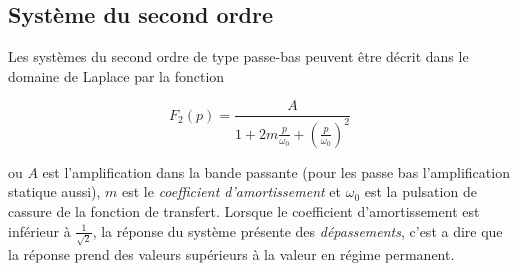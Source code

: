 \documentclass[12pt, a4paper]{report}
\begin{document}
\subsection{Système du second ordre}

Les systèmes du second ordre de type passe-bas peuvent être décrit dans le domaine de Laplace par 
la fonction

\[
  F_{2} (p) =   \frac{A}{1 + 2m \frac{p}{\omega_{0}} + \left( \frac{p}{\omega_{0}} \right)^2}
\]

ou $A$ est l'amplification dans la bande passante (pour les passe bas l'amplification statique aussi), 
$m$ est le \textit{coefficient d'amortissement} et $\omega_{0}$ est la pulsation de cassure de la fonction de 
transfert. Lorsque le coefficient d'amortissement est inférieur à $\frac{1}{\sqrt{2}}$, la réponse du système présente
des \textit{dépassements}, c'est a dire que la réponse prend des valeurs supérieurs à la valeur en régime permanent.
\end{document}
